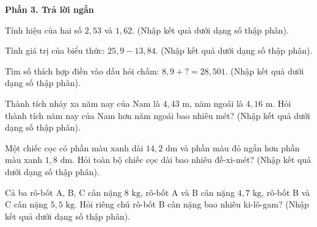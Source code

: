 \textbf{Phần 3. Trả lời ngắn}

\begin{ex} %
Tính hiệu của hai số $2{,}53$ và $1{,}62$. (Nhập kết quả dưới dạng số thập phân).
\end{ex}

\begin{ex} %
Tính giá trị của biểu thức: $25{,}9 - 13{,}84$. (Nhập kết quả dưới dạng số thập phân).
\end{ex}

\begin{ex} %
Tìm số thích hợp điền vào dấu hỏi chấm: $8{,}9 + ? = 28{,}501$. (Nhập kết quả dưới dạng số thập phân).
\end{ex}

\begin{ex} %
Thành tích nhảy xa năm nay của Nam là $4{,}43\text{ m}$, năm ngoái là $4{,}16\text{ m}$. Hỏi thành tích năm nay của Nam hơn năm ngoái bao nhiêu mét? (Nhập kết quả dưới dạng số thập phân).
\end{ex}

\begin{ex} %
Một chiếc cọc có phần màu xanh dài $14{,}2\text{ dm}$ và phần màu đỏ ngắn hơn phần màu xanh $1{,}8\text{ dm}$. Hỏi toàn bộ chiếc cọc dài bao nhiêu đề-xi-mét? (Nhập kết quả dưới dạng số thập phân).
\end{ex}

\begin{ex} %
Cả ba rô-bốt A, B, C cân nặng $8\text{ kg}$, rô-bốt A và B cân nặng $4{,}7\text{ kg}$, rô-bốt B và C cân nặng $5{,}5\text{ kg}$. Hỏi riêng chú rô-bốt B cân nặng bao nhiêu ki-lô-gam? (Nhập kết quả dưới dạng số thập phân).
\end{ex}
